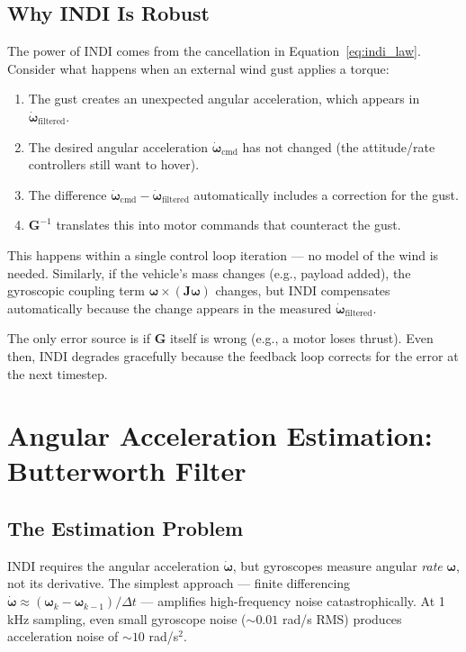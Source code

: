 \documentclass[12pt, a4paper]{article}
\newcommand{\bomega}{\bm{\omega}}
\newcommand{\bJ}{\bm{J}}
\begin{document}
\subsection{Why INDI Is Robust}

The power of INDI comes from the cancellation in Equation~\eqref{eq:indi_law}.  Consider what happens when an external wind gust applies a torque:

\begin{enumerate}
    \item The gust creates an unexpected angular acceleration, which appears in $\dot{\bomega}_{\text{filtered}}$.
    \item The desired angular acceleration $\dot{\bomega}_{\text{cmd}}$ has not changed (the attitude/rate controllers still want to hover).
    \item The difference $\dot{\bomega}_{\text{cmd}} - \dot{\bomega}_{\text{filtered}}$ automatically includes a correction for the gust.
    \item $\bm{G}^{-1}$ translates this into motor commands that counteract the gust.
\end{enumerate}

This happens within a single control loop iteration --- no model of the wind is needed.  Similarly, if the vehicle's mass changes (e.g., payload added), the gyroscopic coupling term $\bomega \times (\bJ\bomega)$ changes, but INDI compensates automatically because the change appears in the measured $\dot{\bomega}_{\text{filtered}}$.

The only error source is if $\bm{G}$ itself is wrong (e.g., a motor loses thrust).  Even then, INDI degrades gracefully because the feedback loop corrects for the error at the next timestep.

\section{Angular Acceleration Estimation: Butterworth Filter}
\label{sec:butterworth}

\subsection{The Estimation Problem}

INDI requires the angular acceleration $\dot{\bomega}$, but gyroscopes measure angular \emph{rate} $\bomega$, not its derivative.  The simplest approach --- finite differencing $\dot{\bomega} \approx (\bomega_k - \bomega_{k-1})/\Delta t$ --- amplifies high-frequency noise catastrophically.  At 1 kHz sampling, even small gyroscope noise ($\sim 0.01$ rad/s RMS) produces acceleration noise of $\sim 10$ rad/s$^2$.
\end{document}
